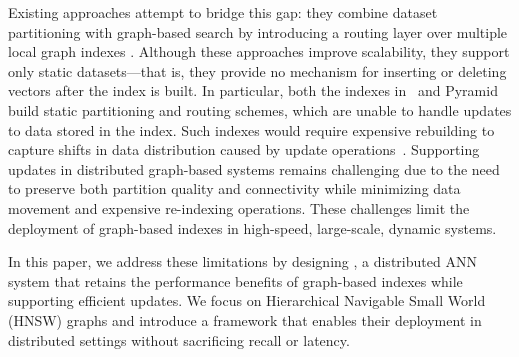 \documentclass[sigconf,review,anonymous]{acmart}
\begin{document}
Existing approaches attempt to bridge this gap: they combine dataset partitioning with graph-based search by introducing a routing layer over multiple local graph indexes \cite{gottensuren2025unleashing, deng2019pyramid}. Although these approaches improve scalability, they support only static datasets---that is, they provide no mechanism for inserting or deleting vectors after the index is built. In particular, both the indexes in~\cite{gottensuren2025unleashing} and Pyramid~\cite{deng2019pyramid} build static partitioning and routing schemes, which are unable to handle updates to data stored in the index. Such indexes would require expensive rebuilding to capture shifts in data distribution caused by update operations~\cite{singh2021freshdiskann, xu2023spfresh, mohoney2025quake}. Supporting updates in distributed graph-based systems remains challenging due to the need to preserve both partition quality and connectivity while minimizing data movement and expensive re-indexing operations. These challenges limit the deployment of graph-based indexes in high-speed, large-scale, dynamic systems.

In this paper, we address these limitations by designing \SystemName{}, a distributed ANN system that retains the performance benefits of graph-based indexes while supporting efficient updates. We focus on Hierarchical Navigable Small World (HNSW) graphs and introduce a framework that enables their deployment in distributed settings without sacrificing recall or latency.
\end{document}
